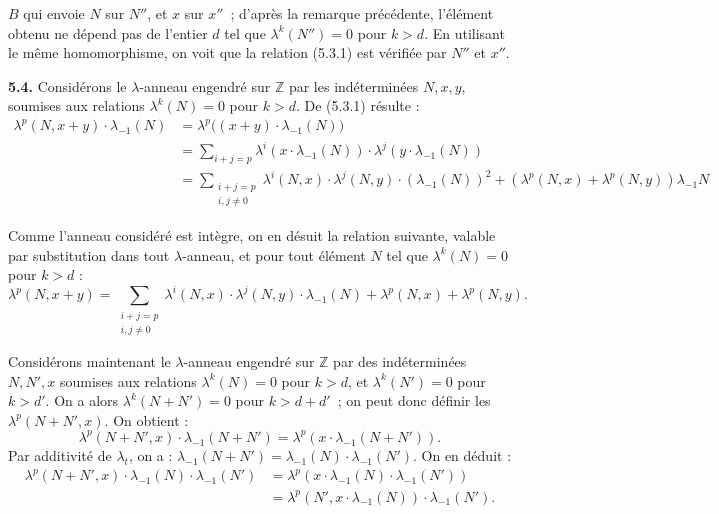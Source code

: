 \(B\) qui
envoie \(N\) sur \(N''\), et \(x\) sur \(x''\)~; d'après la remarque précédente, l'élément obtenu ne dépend pas de l'entier \(d\) tel que \(\lambda^k(N'')=0\) pour \(k>d\). En utilisant le même homomorphisme, on voit que la relation (5.3.1) est vérifiée par \(N''\) et \(x''\).

\textbf{5.4.} Considérons le \(\lambda\)-anneau engendré sur \(\mathbb Z\) par les indéterminées \(N,x,y\), soumises aux relations \(\lambda^k(N)=0\) pour \(k>d\). De (5.3.1) résulte :
\begin{align*}
  \lambda^p(N,x+y)\cdot\lambda_{-1}(N)
  &=\lambda^p\bigl((x+y)\cdot\lambda_{-1}(N)\bigr)\\
  &=\sum_{i+j=p}\lambda^i(x\cdot\lambda_{-1}(N))\cdot\lambda^j(y\cdot\lambda_{-1}(N))\\
  &=\sum_{\substack{i+j=p\\ i,j\ne0}}\lambda^i(N,x)\cdot\lambda^j(N,y)\cdot(\lambda_{-1}(N))^2
    +(\lambda^p(N,x)+\lambda^p(N,y))\lambda_{-1}N
\end{align*}

Comme l'anneau considéré est intègre, on en désuit la relation suivante, valable par substitution dans tout \(\lambda\)-anneau, et pour tout élément \(N\) tel que \(\lambda^k(N)=0\) pour \(k>d\) :
\begin{equation}\tag{5.4.1}
  \lambda^p(N,x+y)=\sum_{\substack{i+j=p\\ i,j\ne0}}\lambda^i(N,x)\cdot\lambda^j(N,y)\cdot\lambda_{-1}(N)+\lambda^p(N,x)+\lambda^p(N,y).
\end{equation}

Considérons maintenant le \(\lambda\)-anneau engendré sur \(\mathbb Z\) par des indéterminées \(N,N',x\) soumises aux relations \(\lambda^k(N)=0\) pour \(k>d\), et \(\lambda^k(N')=0\) pour \(k>d'\). On a alors \(\lambda^k(N+N')=0\) pour \(k>d+d'\)~; on peut donc définir les \(\lambda^p(N+N',x)\). On obtient :
\[
  \lambda^p(N+N',x)\cdot\lambda_{-1}(N+N')=\lambda^p(x\cdot\lambda_{-1}(N+N')).
\]
Par additivité de \(\lambda_t\), on a : \(\lambda_{-1}(N+N')=\lambda_{-1}(N)\cdot\lambda_{-1}(N')\). On en déduit :
\begin{align*}
  \lambda^p(N+N',x)\cdot\lambda_{-1}(N)\cdot\lambda_{-1}(N')
  &=\lambda^p(x\cdot\lambda_{-1}(N)\cdot\lambda_{-1}(N'))\\
  &=\lambda^p(N',x\cdot\lambda_{-1}(N))\cdot\lambda_{-1}(N').
\end{align*}

